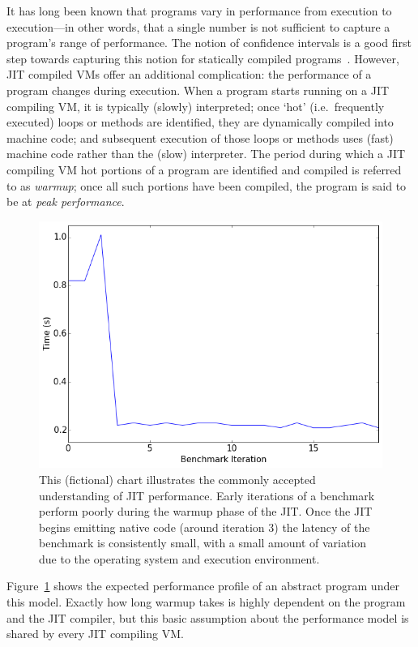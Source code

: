 \documentclass[10pt,preprint]{sigplanconf}
\begin{document}
It has long been known that programs vary in performance from execution to
execution---in other words, that a single number is not sufficient to capture a
program's range of performance. The notion of confidence intervals is a good
first step towards capturing this notion for statically compiled
programs~\cite{fleming86notlying}. However, JIT compiled VMs offer an additional
complication: the performance of a program changes during execution. When a
program starts running on a JIT compiling VM, it is typically (slowly)
interpreted; once `hot' (i.e.~frequently executed) loops or methods are
identified, they are dynamically compiled into machine code; and subsequent
execution of those loops or methods uses (fast) machine code rather than the
(slow) interpreter. The period during which a JIT compiling VM hot portions of a
program are identified and compiled is referred to as \emph{warmup}; once all
such portions have been compiled, the program is said to be at \emph{peak
performance}.

\begin{figure}[h!]
\centering
\includegraphics[width=.4\textwidth]{img/trad}
\caption{ This (fictional) chart illustrates the commonly accepted understanding
of JIT performance. Early iterations of a benchmark perform poorly during the
warmup phase of the JIT. Once the JIT begins emitting native code (around
iteration 3) the latency of the benchmark is consistently small, with a small
amount of variation due to the operating system and execution environment.}
\label{fig:trad}
\end{figure}

Figure~\ref{fig:trad} shows the expected performance profile of an abstract
program under this model. Exactly how long warmup takes is highly dependent on
the program and the JIT compiler, but this basic assumption about the
performance model is shared by every JIT compiling VM.
\end{document}

